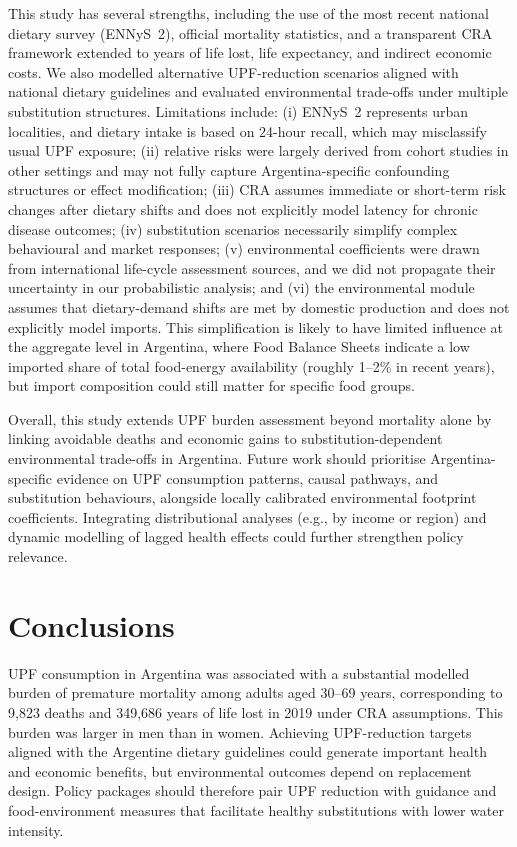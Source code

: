 ﻿\documentclass{article}
\begin{document}
This study has several strengths, including the use of the most recent national dietary survey (ENNyS~2), official mortality statistics, and a transparent CRA framework extended to years of life lost, life expectancy, and indirect economic costs. We also modelled alternative UPF-reduction scenarios aligned with national dietary guidelines and evaluated environmental trade-offs under multiple substitution structures. Limitations include: (i) ENNyS~2 represents urban localities, and dietary intake is based on 24-hour recall, which may misclassify usual UPF exposure; (ii) relative risks were largely derived from cohort studies in other settings and may not fully capture Argentina-specific confounding structures or effect modification; (iii) CRA assumes immediate or short-term risk changes after dietary shifts and does not explicitly model latency for chronic disease outcomes; (iv) substitution scenarios necessarily simplify complex behavioural and market responses; (v) environmental coefficients were drawn from international life-cycle assessment sources, and we did not propagate their uncertainty in our probabilistic analysis;\cite{PooreNemecek2018,ADEMEAgribalyse2026} and (vi) the environmental module assumes that dietary-demand shifts are met by domestic production and does not explicitly model imports. This simplification is likely to have limited influence at the aggregate level in Argentina, where Food Balance Sheets indicate a low imported share of total food-energy availability (roughly 1--2\% in recent years), but import composition could still matter for specific food groups.\cite{FAOSTATFBS2026}

Overall, this study extends UPF burden assessment beyond mortality alone by linking avoidable deaths and economic gains to substitution-dependent environmental trade-offs in Argentina. Future work should prioritise Argentina-specific evidence on UPF consumption patterns, causal pathways, and substitution behaviours, alongside locally calibrated environmental footprint coefficients. Integrating distributional analyses (e.g., by income or region) and dynamic modelling of lagged health effects could further strengthen policy relevance.

\section{Conclusions}\label{conclusions}

UPF consumption in Argentina was associated with a substantial modelled burden of premature mortality among adults aged 30--69 years, corresponding to 9,823 deaths and 349,686 years of life lost in 2019 under CRA assumptions. This burden was larger in men than in women. Achieving UPF-reduction targets aligned with the Argentine dietary guidelines could generate important health and economic benefits, but environmental outcomes depend on replacement design. Policy packages should therefore pair UPF reduction with guidance and food-environment measures that facilitate healthy substitutions with lower water intensity.
\end{document}
